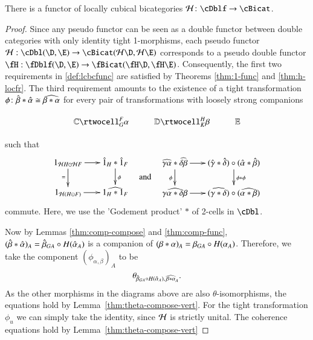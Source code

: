 {

\begin{thm}\label{thm:h-functor}
There is a functor of locally cubical bicategories $\cH\maps \cDblf\to \cBicat$.
\end{thm}
\begin{proof}
Since any pseudo functor can be seen as a double functor between double categories with only identity tight 1-morphisms, each pseudo functor $\cH: \cDbl(\D,\E) \rightarrow \cBicat(\cH\D, \cH \E)$ corresponds to a pseudo double functor $\fH: \fDblf(\D,\E) \rightarrow \fBicat(\fH\D, \fH \E)$. Consequently, the first two requirements in \autoref{def:lcbcfunc} are satisfied by Theorems \ref{thm:1-func} and \ref{thm:h-locfr}.
The third requirement amounts to the existence of a tight transformation $\phi\colon \hat{\beta} * \hat{\alpha} \cong \widehat{\beta*\alpha}$ for every pair of transformations with loosely strong companions 

  \[\vcenter{\xymatrix{\lC \rtwocell^F_G{\al} & \lD \rtwocell^H_K{\be}
      & \lE}}\]
      
      such that 
%
 \begin{equation}
        \vcenter{\xymatrix@-.5pc{
        1_{{\cH}H \odot {\cH}F} \ar[r]\ar[d]_{=} &
        \hat{1}_{H}* \hat{1}_{F}\ar[d]^{\phi}\\
        1_{{\cH}(H \odot F)}\ar[r] &
        \widehat{1_{H} * 1_{F}}}} \quad\text{and}\quad       
    \vcenter{\xymatrix@-.5pc{
        \widehat{\gm\al}* \widehat{\de\be} \ar[r]\ar[d]_\phi &
        (\gmhat* \dehat)\circ(\alhat* \behat)\ar[d]^{\phi * \phi}\\
        \widehat{\gm\al* \de\be}\ar[r] &
        (\widehat{\gm* \de})\circ(\widehat{\al* \be})}}
  \end{equation}
commute. 
Here, we use the 'Godement product' $*$ of 2-cells in $\cDbl$.  

  Now by Lemmas \ref{thm:comp-compose} and
  \ref{thm:comp-func}, $(\hat{\beta} *\hat{\alpha})_A = \hat{\beta}_{GA} \circ
  H(\hat{\alpha}_A)$ is a companion of $(\beta*\alpha)_A = \beta_{GA} \circ
  H(\alpha_A)$.  Therefore, we take the component $(\phi_{\alpha,\beta})_A$ to be
  \[\theta_{\hat{\beta}_{GA} \circ H(\hat{\alpha}_A),\, \widehat{\beta*\alpha}_A}.\]
 As the other morphisms in the diagrams above are also $\theta$-isomorphisms, the equations hold by Lemma~\ref{thm:theta-compose-vert}.
For the tight transformation  $\phi_u$ we can simply take the identity, since $\mathcal{H}$ is strictly unital.
The coherence equations hold by Lemma~\ref{thm:theta-compose-vert}
\end{proof}


}

